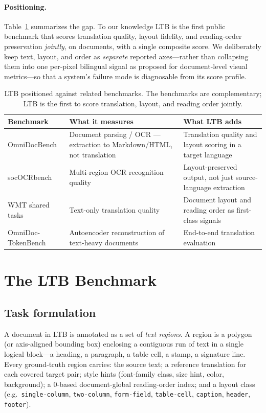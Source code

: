 \documentclass[11pt]{article}
\begin{document}
\paragraph{Positioning.} Table~\ref{tab:related} summarizes the gap. To our
knowledge LTB is the first public benchmark that scores translation quality,
layout fidelity, and reading-order preservation \emph{jointly}, on documents,
with a single composite score. We deliberately keep text, layout, and order as
\emph{separate} reported axes---rather than collapsing them into one per-pixel
bilingual signal as proposed for document-level visual metrics---so that a
system's failure mode is diagnosable from its score profile.

\begin{table}[t]
\centering
\small
\begin{tabular}{@{}p{3.0cm}p{5.0cm}p{5.0cm}@{}}
\toprule
\textbf{Benchmark} & \textbf{What it measures} & \textbf{What LTB adds} \\
\midrule
OmniDocBench & Document parsing / OCR --- extraction to Markdown/HTML, not
translation & Translation quality and layout scoring in a target language \\
\addlinespace
socOCRbench & Multi-region OCR recognition quality & Layout-preserved output,
not just source-language extraction \\
\addlinespace
WMT shared tasks & Text-only translation quality & Document layout and reading
order as first-class signals \\
\addlinespace
OmniDoc-TokenBench & Autoencoder reconstruction of text-heavy documents &
End-to-end translation evaluation \\
\bottomrule
\end{tabular}
\caption{LTB positioned against related benchmarks. The benchmarks are
complementary; LTB is the first to score translation, layout, and reading order
jointly.}
\label{tab:related}
\end{table}

\section{The LTB Benchmark}
\label{sec:benchmark}

\subsection{Task formulation}

A document in LTB is annotated as a set of \emph{text regions}. A region is a
polygon (or axis-aligned bounding box) enclosing a contiguous run of text in a
single logical block---a heading, a paragraph, a table cell, a stamp, a
signature line. Every ground-truth region carries: the source text; a reference
translation for each covered target pair; style hints (font-family class,
size hint, color, background); a 0-based document-global reading-order index;
and a layout class (e.g.\ \texttt{single-column}, \texttt{two-column},
\texttt{form-field}, \texttt{table-cell}, \texttt{caption}, \texttt{header},
\texttt{footer}).
\end{document}
